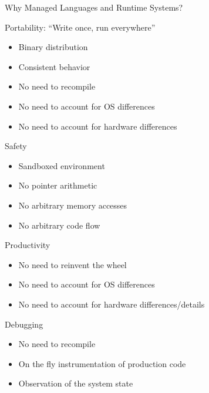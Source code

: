 \documentclass[
14pt,
aspectratio=169,
usenames,
dvipsnames,
x11names]{beamer}
\begin{document}
\begin{frame}
  \centering
  \Large
  Why Managed Languages and Runtime Systems?
\end{frame}

\begin{frame}{Portability: ``Write once, run everywhere''}
  \begin{itemize}  \setlength{\itemsep}{\fill}
  \item Binary distribution
  \item Consistent behavior
  \item No need to recompile
  \item No need to account for OS differences
  \item No need to account for hardware differences
  \end{itemize}
\end{frame}

\begin{frame}{Safety}
  \begin{itemize}  \setlength{\itemsep}{\fill}
  \item Sandboxed environment
  \item No pointer arithmetic
  \item No arbitrary memory accesses
  \item No arbitrary code flow
  \end{itemize}
\end{frame}

\begin{frame}{Productivity}
  \begin{itemize}  \setlength{\itemsep}{\fill}
  \item No need to reinvent the wheel
  \item No need to account for OS differences
  \item No need to account for hardware differences/details
  \end{itemize}
\end{frame}

\begin{frame}{Debugging}
  \begin{itemize}  \setlength{\itemsep}{\fill}
  \item No need to recompile
  \item On the fly instrumentation of production code
  \item Observation of the system state
  \end{itemize}
\end{frame}
\end{document}
